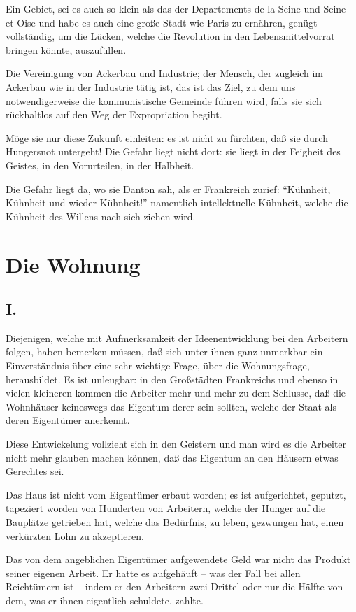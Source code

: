 \documentclass{scrbook}
\begin{document}
Ein Gebiet, sei es auch so klein als das der Departements de la Seine und Seine-et-Oise und habe es auch eine große Stadt wie Paris zu ernähren, genügt vollständig, um die Lücken, welche die Revolution in den Lebensmittelvorrat bringen könnte, auszufüllen.

Die Vereinigung von Ackerbau und Industrie; der Mensch, der zugleich im Ackerbau wie in der Industrie tätig ist, das ist das Ziel, zu dem uns notwendigerweise die kommunistische Gemeinde führen wird, falls sie sich rückhaltlos auf den Weg der Expropriation begibt.

Möge sie nur diese Zukunft einleiten: es ist nicht zu fürchten, daß sie durch Hungersnot untergeht! Die Gefahr liegt nicht dort: sie liegt in der Feigheit des Geistes, in den Vorurteilen, in der Halbheit.

Die Gefahr liegt da, wo sie Danton sah, als er Frankreich zurief: ``Kühnheit, Kühnheit und wieder Kühnheit!'' namentlich intellektuelle Kühnheit, welche die Kühnheit des Willens nach sich ziehen wird.

\chapter{Die Wohnung}
\section*{I.}

Diejenigen, welche mit Aufmerksamkeit der Ideenentwicklung bei den Arbeitern folgen, haben bemerken müssen, daß sich unter ihnen ganz unmerkbar ein Einverständnis über eine sehr wichtige Frage, über die Wohnungsfrage, herausbildet. Es ist unleugbar: in den Großstädten Frankreichs und ebenso in vielen kleineren kommen die Arbeiter mehr und mehr zu dem Schlusse, daß die Wohnhäuser keineswegs das Eigentum derer sein sollten, welche der Staat als deren Eigentümer anerkennt.

Diese Entwickelung vollzieht sich in den Geistern und man wird es die Arbeiter nicht mehr glauben machen können, daß das Eigentum an den Häusern etwas Gerechtes sei.

Das Haus ist nicht vom Eigentümer erbaut worden; es ist aufgerichtet, geputzt, tapeziert worden von Hunderten von Arbeitern, welche der Hunger auf die Bauplätze getrieben hat, welche das Bedürfnis, zu leben, gezwungen hat, einen verkürzten Lohn zu akzeptieren.

Das von dem angeblichen Eigentümer aufgewendete Geld war nicht das Produkt seiner eigenen Arbeit. Er hatte es aufgehäuft – was der Fall bei allen Reichtümern ist – indem er den Arbeitern zwei Drittel oder nur die Hälfte von dem, was er ihnen eigentlich schuldete, zahlte.
\end{document}

